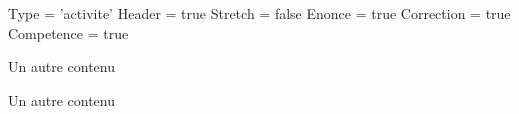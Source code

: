 \documentclass{classe-tex3R}
\begin{document}
\begin{luacode*}
  Type = 'activite'
  Header = true
  Stretch = false
  Enonce = true
  Correction = true
  Competence = true
\end{luacode*}
\parametrage


\begin{enonce}
  Un autre contenu
\end{enonce}

\begin{correction}
  Un autre contenu
\end{correction}
\end{document}

